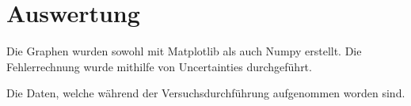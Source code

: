 \section{Auswertung}
\label{sec:Auswertung}



Die Graphen wurden sowohl mit Matplotlib\cite{matplotlib} als auch Numpy\cite{numpy} erstellt. Die
 Fehlerrechnung wurde mithilfe von Uncertainties\cite{uncertainties} durchgeführt.








 \begin{table}
   \centering
   \caption{Die Daten, welche während der Versuchsdurchführung aufgenommen worden sind.}
   \label{tab:daten}
 \end{table}








